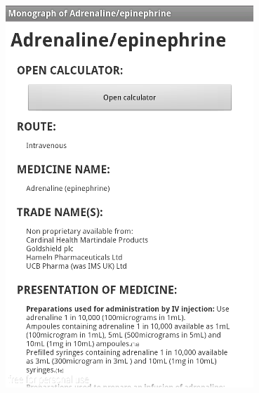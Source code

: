 \begin{figure}[H]
\centering
\begin{minipage}{.5\textwidth}
  \centering
  \includegraphics[width=.8\linewidth]{Images/screenshots/API10/view.png}
\end{minipage}%
\begin{minipage}{.5\textwidth}
  \centering

\end{minipage}
\end{figure}
